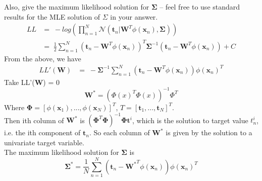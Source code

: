 \begin{enumerate}
 Also, give the maximum likelihood solution for $\mathbf{\Sigma}$ -- feel free to use standard results for the MLE solution of $\Sigma$ in your answer. 
\begin{align*}
    LL &=\;-log(\prod_{n=1}^{N}\mathcal{N}(\mathbf{t}_n|\mathbf{W}^T\phi(\mathbf{x}_n),\mathbf{\Sigma})) \\ 
    &=\;\frac{1}{2}\sum_{n=1}^{N}(\mathbf{t}_n-\mathbf{W}^T\phi(\mathbf{x}_n))^T \mathbf{\Sigma}^{-1}(\mathbf{t}_n-\mathbf{W}^T\phi(\mathbf{x}_n)) + C
\end{align*}
From the above, we have    
\begin{align*}  
    LL'(\mathbf{W}) &=\; -\mathbf{\Sigma}^{-1}\sum_{n=1}^{N}(\mathbf{t}_n-\mathbf{W}^T\phi(\mathbf{x}_n))\phi(\mathbf{x}_n)^T
\end{align*}
Take LL'($\mathbf{W}$) = 0
$$ \mathbf{W}^{*} = (\Phi(x)^T\Phi(x))^{-1}{\Phi}^T $$
Where $\mathbf{\Phi} = [\phi(\mathbf{x}_1), ...,\phi(\mathbf{x}_N)]^T$, $T = [\mathbf{t}_1, ..., \mathbf{t}_N]^T$.\\
Then ith column of $\mathbf{W}^*$ is $(\mathbf{\Phi}^T\mathbf{\Phi})^{-1}\mathbf{\Phi}\mathbf{t}^i$, which is the solution to target value $t_n^i$, i.e. the ith component of $\mathbf{t}_n$. So each column of $\mathbf{W}^{*}$ is given by the solution to a univariate target variable.\\
The maximum likelihood solution for $\mathbf{\Sigma}$ is 
$$
\mathbf{\Sigma}^* = \frac{1}{N}\sum_{n=1}^{N}(\mathbf{t}_n-\mathbf{W^*}^T\phi(\mathbf{x}_n))\phi(\mathbf{x}_n)^T
$$


\end{enumerate}